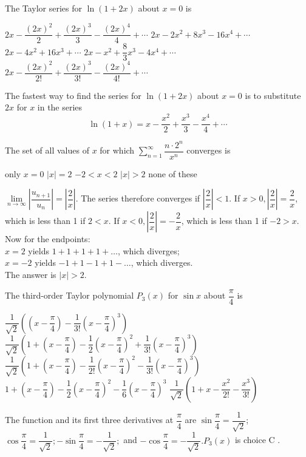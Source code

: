 \question
The Taylor series for $\ln (1+2 x)$ about $x=0$ is
\begin{choices}
  \CorrectChoice $2 x-\dfrac{(2 x)^{2}}{2}+\dfrac{(2 x)^{3}}{3}-\dfrac{(2 x)^{4}}{4}+\cdots$
  \choice $2 x-2 x^{2}+8 x^{3}-16 x^{4}+\cdots$
  \choice $2 x-4 x^{2}+16 x^{3}+\cdots$
  \choice $2 x-x^{2}+\dfrac{8}{3} x^{3}-4 x^{4}+\cdots$
  \choice $2 x-\dfrac{(2 x)^{2}}{2!}+\dfrac{(2 x)^{3}}{3!}-\dfrac{(2 x)^{4}}{4!}+\cdots$
\end{choices}
\begin{solution}
The fastest way to find the series for $\ln (1+2 x)$ about $x=0$ is to substitute $2 x$ for $x$ in the series
\[
\ln (1+x)=x-\dfrac{x^{2}}{2}+\dfrac{x^{3}}{3}-\dfrac{x^{4}}{4}+\cdots
\]
\end{solution}

\question
The set of all values of $x$ for which $\sum\limits_{n=1}^{\infty} \dfrac{n \cdot 2^{n}}{x^{n}}$ converges is
\begin{choices}
  \choice only $x=0$
  \choice $|x|=2$
  \choice $-2<x<2$
  \CorrectChoice $|x|>2$
  \choice none of these
\end{choices}
\begin{solution}
$\lim\limits_{n \to \infty}\left|\dfrac{u_{n+1}}{u_{n}}\right|=\left|\dfrac{2}{x}\right|$. The series therefore converges if $\left|\dfrac{2}{x}\right|<1$. If $x>0,\left|\dfrac{2}{x}\right|=\dfrac{2}{x}$, which is less than 1 if $2<x$. If $x<0,\left|\dfrac{2}{x}\right|=-\dfrac{2}{x}$, which is less than 1 if $-2>x$. Now for the endpoints:\\
$x=2$ yields $1+1+1+1+\ldots$, which diverges;\\
$x=-2$ yields $-1+1-1+1-\ldots$, which diverges.\\
The answer is $|x|>2$.
\end{solution}



\newpage




\question
The third-order Taylor polynomial $P_{3}(x)$ for $\sin x$ about $\dfrac{\pi}{4}$ is
\begin{choices}
  \choice $\dfrac{1}{\sqrt{2}}\left(\left(x-\dfrac{\pi}{4}\right)-\dfrac{1}{3!}\left(x-\dfrac{\pi}{4}\right)^{3}\right)$
  \choice $\dfrac{1}{\sqrt{2}}\left(1+\left(x-\dfrac{\pi}{4}\right)-\dfrac{1}{2}\left(x-\dfrac{\pi}{4}\right)^{2}+\dfrac{1}{3!}\left(x-\dfrac{\pi}{4}\right)^{3}\right)$
  \CorrectChoice $\dfrac{1}{\sqrt{2}}\left(1+\left(x-\dfrac{\pi}{4}\right)-\dfrac{1}{2!}\left(x-\dfrac{\pi}{4}\right)^{2}-\dfrac{1}{3!}\left(x-\dfrac{\pi}{4}\right)^{3}\right)$
  \choice $1+\left(x-\dfrac{\pi}{4}\right)-\dfrac{1}{2}\left(x-\dfrac{\pi}{4}\right)^{2}-\dfrac{1}{6}\left(x-\dfrac{\pi}{4}\right)^{3}$
  \choice $\dfrac{1}{\sqrt{2}}\left(1+x-\dfrac{x^{2}}{2!}-\dfrac{x^{3}}{3!}\right)$
\end{choices}
\begin{solution}
The function and its first three derivatives at $\dfrac{\pi}{4}$ are $\sin \dfrac{\pi}{4}=\dfrac{1}{\sqrt{2}}$; $\cos \dfrac{\pi}{4}=\dfrac{1}{\sqrt{2}} ;-\sin \dfrac{\pi}{4}=-\dfrac{1}{\sqrt{2}} ;$ and $-\cos \dfrac{\pi}{4}=-\dfrac{1}{\sqrt{2}} . P_{3}(x)$ is choice C .

\end{solution}